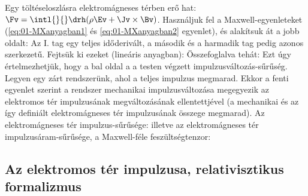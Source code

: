    Egy töltéseloszlásra elektromágneses térben erő hat: $\displaystyle\Fv=\intl{}{}\drh(\rho\Ev+\Jv\times\Bv)$.
   Használjuk fel a Maxwell-egyenleteket (\eqref{eq:01-MXanyagban1} és \eqref{eq:01-MXanyagban2} egyenlet), és alakítsuk át a jobb oldalt:
   Az I. tag egy teljes időderivált, a második és a harmadik tag pedig azonos szerkezetű.
   Fejtsük ki ezeket (lineáris anyagban):
   Összefoglalva tehát:
   Ezt úgy értelmezhetjük, hogy a bal oldal a a testen végzett impulzusváltozás-sűrűség.
   Legyen egy zárt rendszerünk, ahol a teljes impulzus megmarad.
   Ekkor a fenti egyenlet szerint a rendszer mechanikai impulzusváltozása megegyezik az elektromos tér impulzusának megváltozásának ellentettjével (a mechanikai és az így definiált elektromágneses tér impulzusának összege megmarad).
   Az elektromágneses tér impulzus-sűrűsége:
   illetve az elektromágneses tér impulzusáram-sűrűsége, a Maxwell-féle feszültségtenzor:
   
  \subsection{Az elektromos tér impulzusa, relativisztikus formalizmus}\label{ss:05-energiaimptenzor}
   
